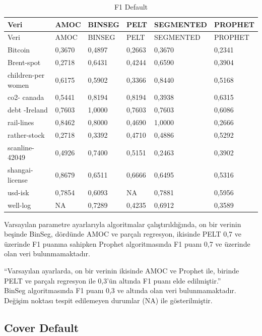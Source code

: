 \documentclass[12pt,twoside]{deuthesis}
\begin{document}
\begin{longtable}[]{@{}llllll@{}}
\caption{\label{tab:nvar3} F1 Default}\tabularnewline
\toprule\noalign{}
Veri & AMOC & BINSEG & PELT & SEGMENTED & PROPHET \\
\midrule\noalign{}
\endfirsthead
\toprule\noalign{}
Veri & AMOC & BINSEG & PELT & SEGMENTED & PROPHET \\
\midrule\noalign{}
\endhead
\bottomrule\noalign{}
\endlastfoot
Bitcoin & 0,3670 & 0,4897 & 0,2663 & 0,3670 & 0,2341 \\
Brent-spot & 0,2718 & 0,6431 & 0,4244 & 0,6590 & 0,3904 \\
children-per women & 0,6175 & 0,5902 & 0,3366 & 0,8440 & 0,5168 \\
co2- canada & 0,5441 & 0,8194 & 0,8194 & 0,3938 & 0,6315 \\
debt -Ireland & 0,7603 & 1,0000 & 0,7603 & 0,7603 & 0,6086 \\
rail-lines & 0,8462 & 0,8000 & 0,4690 & 1,0000 & 0,2666 \\
rather-stock & 0,2718 & 0,3392 & 0,4710 & 0,4886 & 0,5292 \\
scanline-42049 & 0,4926 & 0,7400 & 0,5151 & 0,2463 & 0,3902 \\
shangai-license & 0,8679 & 0,6511 & 0,6666 & 0,6495 & 0,5316 \\
usd-isk & 0,7854 & 0,6093 & NA & 0,7881 & 0,5956 \\
well-log & NA & 0,7289 & 0,4235 & 0,6912 & 0,3589 \\
\end{longtable}

Varsayılan parametre ayarlarıyla algoritmalar çalıştırıldığında, on bir verinin beşinde BinSeg, dördünde AMOC ve parçalı regresyon, ikisinde PELT 0,7 ve üzerinde F1 puanına sahipken Prophet algoritmasında F1 puanı 0,7 ve üzerinde olan veri bulunmamaktadır.

``Varsayılan ayarlarda, on bir verinin ikisinde AMOC ve Prophet ile, birinde PELT ve parçalı regresyon ile 0,3'ün altında F1 puanı elde edilmiştir.''\\
BinSeg algoritmasında F1 puanı 0,3 ve altında olan veri bulunmamaktadır.\\
Değişim noktası tespit edilemeyen durumlar (NA) ile gösterilmiştir.

\hypertarget{cover-default}{%
\subsection{Cover Default}\label{cover-default}}
\end{document}

